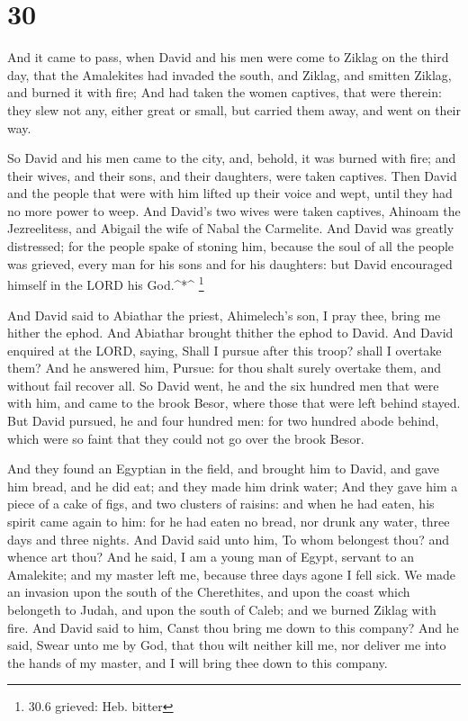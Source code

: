 \hypertarget{section-29}{%
\section{30}\label{section-29}}

 And it came to pass, when David and his men were come to
Ziklag on the third day, that the Amalekites had invaded the south, and
Ziklag, and smitten Ziklag, and burned it with fire;  And
had taken the women captives, that were therein: they slew not any,
either great or small, but carried them away, and went on their way.

 So David and his men came to the city, and, behold, it was
burned with fire; and their wives, and their sons, and their daughters,
were taken captives.  Then David and the people that were
with him lifted up their voice and wept, until they had no more power to
weep.  And David's two wives were taken captives, Ahinoam
the Jezreelitess, and Abigail the wife of Nabal the Carmelite.
 And David was greatly distressed; for the people spake of
stoning him, because the soul of all the people was grieved, every man
for his sons and for his daughters: but David encouraged himself in the
LORD his God.\^{}*\^{} \footnote{30.6 grieved: Heb. bitter}

 And David said to Abiathar the priest, Ahimelech's son, I
pray thee, bring me hither the ephod. And Abiathar brought thither the
ephod to David.  And David enquired at the LORD, saying,
Shall I pursue after this troop? shall I overtake them? And he answered
him, Pursue: for thou shalt surely overtake them, and without fail
recover all.  So David went, he and the six hundred men that
were with him, and came to the brook Besor, where those that were left
behind stayed.  But David pursued, he and four hundred men:
for two hundred abode behind, which were so faint that they could not go
over the brook Besor.

 And they found an Egyptian in the field, and brought him
to David, and gave him bread, and he did eat; and they made him drink
water;  And they gave him a piece of a cake of figs, and
two clusters of raisins: and when he had eaten, his spirit came again to
him: for he had eaten no bread, nor drunk any water, three days and
three nights.  And David said unto him, To whom belongest
thou? and whence art thou? And he said, I am a young man of Egypt,
servant to an Amalekite; and my master left me, because three days agone
I fell sick.  We made an invasion upon the south of the
Cherethites, and upon the coast which belongeth to Judah, and upon the
south of Caleb; and we burned Ziklag with fire.  And David
said to him, Canst thou bring me down to this company? And he said,
Swear unto me by God, that thou wilt neither kill me, nor deliver me
into the hands of my master, and I will bring thee down to this company.


